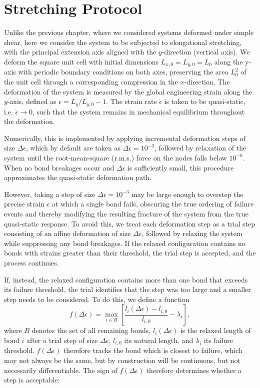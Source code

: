 \section{Stretching Protocol} \label{sec:NetworkQuasistatic}
Unlike the previous chapter, where we considered systems deformed under simple shear, here we consider the system to be subjected to elongational stretching, with the principal extension axis aligned with the $y$-direction (vertical axis). We deform the square unit cell with initial dimensions $L_{x,0} = L_{y,0}=L_0$ along the y-axis with periodic boundary conditions on both axes, preserving the area $L_0^2$ of the unit cell through a corresponding compression in the $x$-direction. The deformation of the system is measured by the global engineering strain along the $y$-axis, defined as $\epsilon = L_{y}/L_{y,0} - 1$. The strain rate $\dot{\epsilon}$ is taken to be quasi-static, i.e. $\dot{\epsilon} \to 0$, such that the system remains in mechanical equilibrium throughout the deformation.

Numerically, this is implemented by applying incremental deformation steps of size $\Delta \epsilon$, which by default are taken as $\Delta \epsilon = 10^{-3}$, followed by relaxation of the system until the root-mean-square (r.m.s.) force on the nodes falls below $10^{-6}$. When no bond breakages occur and $\Delta \epsilon$ is sufficiently small, this procedure approximates the quasi-static deformation path.

However, taking a step of size $\Delta\epsilon=10^{-3}$ may be large enough to overstep the precise strain $\epsilon$ at which a single bond fails, obscuring the true ordering of failure events and thereby modifying the resulting fracture of the system from the true quasi-static response. To avoid this, we treat each deformation step as a trial step consisting of an affine deformation of size $\Delta\epsilon$, followed by relaxing the system while suppressing any bond breakages. If the relaxed configuration contains no bonds with strains greater than their threshold, the trial step is accepted, and the process continues.

If, instead, the relaxed configuration contains more than one bond that exceeds its failure threshold, the trial identifies that the step was too large and a smaller step needs to be considered. To do this, we define a function
\begin{equation*}
    f(\Delta\epsilon) = \max_{i\in B} \left[ \frac{l_i(\Delta\epsilon)-l_{i,0}}{l_{i,0}} - \lambda_i \right],
\end{equation*}
where $B$ denotes the set of all remaining bonds, $l_i(\Delta\epsilon)$ is the relaxed length of bond $i$ after a trial step of size $\Delta\epsilon$, $l_{i,0}$ its natural length, and $\lambda_i$ its failure threshold. $f(\Delta\epsilon)$ therefore tracks the bond which is closest to failure, which may not always be the same, but by construction will be continuous, but not necessarily differentiable. The sign of $f(\Delta\epsilon)$ therefore determines whether a step is acceptable:

